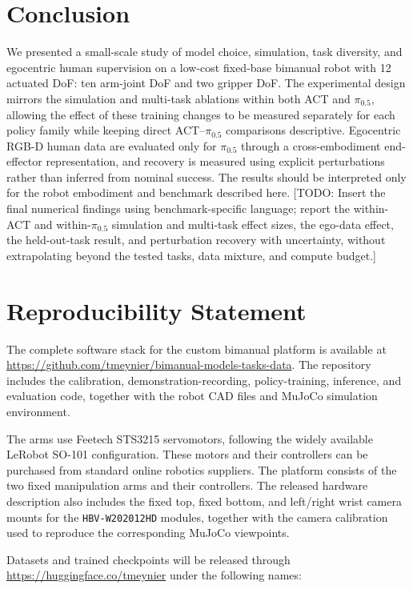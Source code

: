 \documentclass[10pt,conference]{IEEEtran}
\newcommand{\TODO}[1]{\textcolor{red!70!black}{[TODO: #1]}}
\begin{document}
\section{Conclusion}
\label{sec:conclusion}

We presented a small-scale study of model choice, simulation, task diversity,
and egocentric human supervision on a low-cost fixed-base bimanual robot with
12 actuated DoF: ten arm-joint DoF and two gripper DoF. The experimental design
mirrors the simulation and multi-task ablations
within both ACT and $\pi_{0.5}$, allowing the effect of these training changes
to be measured separately for each policy family while keeping direct
ACT--$\pi_{0.5}$ comparisons descriptive. Egocentric RGB-D human data are
evaluated only for $\pi_{0.5}$ through a cross-embodiment end-effector
representation, and recovery is measured using explicit perturbations rather
than inferred from nominal success. The results should be interpreted only for
the robot embodiment and benchmark described here. \TODO{Insert the final
numerical findings using benchmark-specific language; report the within-ACT and
within-$\pi_{0.5}$ simulation and multi-task effect sizes, the ego-data effect,
the held-out-task result, and perturbation recovery with uncertainty, without
extrapolating beyond the tested tasks, data mixture, and compute budget.}

\section*{Reproducibility Statement}

The complete software stack for the custom bimanual platform is available at
\url{https://github.com/tmeynier/bimanual-models-tasks-data}. The repository includes the calibration,
demonstration-recording, policy-training, inference, and evaluation code,
together with the robot CAD files and MuJoCo simulation environment.

The arms use Feetech STS3215 servomotors, following the widely available
LeRobot SO-101 configuration. These motors and their controllers can be
purchased from standard online robotics suppliers. The platform consists of
the two fixed manipulation arms and their controllers. The released hardware
description also includes the fixed top, fixed bottom, and left/right wrist
camera mounts for the \texttt{HBV-W202012HD} modules, together with the camera
calibration used to reproduce the corresponding MuJoCo viewpoints.

Datasets and trained checkpoints will be released through
\url{https://huggingface.co/tmeynier} under the following names:
\end{document}
